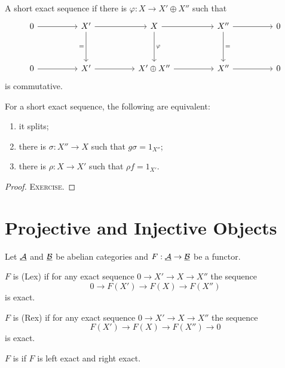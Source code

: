 \begin{definition*}
	A short exact sequence  if there is \( \varphi: X \to X' \oplus X'' \) such that
	\[
		\begin{tikzcd}
			0 && {X'} && X && {X''} && 0 \\
			\\
			0 && {X'} && {X' \oplus X''} && {X''} && 0
			\arrow[from=1-1, to=1-3]
			\arrow[from=1-3, to=1-5]
			\arrow["{=}"', from=1-3, to=3-3]
			\arrow[from=1-5, to=1-7]
			\arrow["\varphi", from=1-5, to=3-5]
			\arrow[from=1-7, to=1-9]
			\arrow["{=}", from=1-7, to=3-7]
			\arrow[from=3-1, to=3-3]
			\arrow[from=3-3, to=3-5]
			\arrow[from=3-5, to=3-7]
			\arrow[from=3-7, to=3-9]
		\end{tikzcd}
	\]
	is commutative.
\end{definition*}

\begin{proposition*}
	For a short exact sequence, the following are equivalent:
	\begin{enumerate}
		\item it splits;
		\item there is \( \sigma: X'' \to X \) such that \( g \sigma = 1_{X''} \);
		\item there is \( \rho: X \to X' \) such that \( \rho f = 1_{X'} \).
	\end{enumerate}
\end{proposition*}
\begin{proof}
	\textsc{Exercise}.
\end{proof}

\section{Projective and Injective Objects}

Let \( \underline{\mathcal A} \) and \( \underline{\mathcal B} \) be abelian categories and \( F: \underline{\mathcal A} \to \underline{\mathcal B} \) be a functor.

\begin{definitions*}
	\item \( F \) is  (Lex) if for any exact sequence \( 0 \to X' \to X \to X'' \) the sequence
		\[
			0 \to F(X') \to F(X) \to F(X'')
		\]
		is exact.
	\item \( F \) is  (Rex) if for any exact sequence \( 0 \to X' \to X \to X'' \) the sequence
		\[
			F(X') \to F(X) \to F(X'') \to 0
		\]
		is exact.
	\item \( F \) is  if \( F \) is left exact and right exact.
\end{definitions*}

